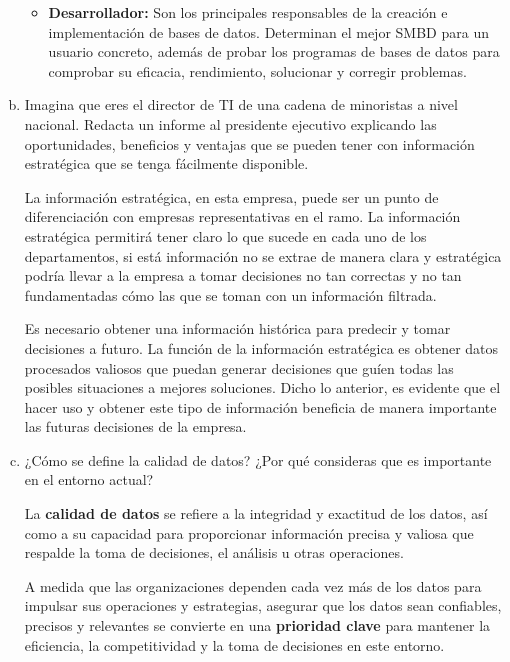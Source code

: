 \documentclass[12pt]{article}
\begin{document}
\begin{enumerate}[a.]
\begin{itemize}
    \item \textbf{Desarrollador: } Son los principales responsables de la creación e implementación de bases de datos. Determinan el mejor SMBD para un usuario concreto, además de probar los programas de bases de datos para comprobar su eficacia, rendimiento, solucionar y corregir problemas.


\end{itemize}

\item Imagina que eres el director de TI de una cadena de minoristas a nivel nacional. Redacta un informe al presidente ejecutivo explicando las oportunidades, beneficios y ventajas que se pueden tener con información estratégica que se tenga fácilmente disponible.\newline

La información estratégica, en esta empresa, puede ser un punto de diferenciación con empresas representativas en el ramo. La información estratégica permitirá tener claro lo que sucede en cada uno de los departamentos, si está información no se extrae de manera clara y estratégica podría llevar a la empresa a tomar decisiones no tan correctas y no tan fundamentadas cómo las que se toman con un información filtrada.\newline

Es necesario obtener una información histórica para predecir y tomar decisiones a futuro. La función de la información estratégica es obtener datos procesados valiosos que puedan generar decisiones que guíen todas las posibles situaciones a mejores soluciones. Dicho lo anterior, es evidente que el hacer uso y obtener este tipo de información beneficia de manera importante las futuras decisiones de la empresa.

\item ¿Cómo se define la calidad de datos? ¿Por qué consideras que es importante en el entorno actual?

La \textbf{calidad de datos} se refiere a la integridad y exactitud de los datos, así como a su capacidad para proporcionar información precisa y valiosa que respalde la toma de decisiones, el análisis u otras operaciones. 

A medida que las organizaciones dependen cada vez más de los datos para impulsar sus operaciones y estrategias, asegurar que los datos sean confiables, precisos y relevantes se convierte en una \textbf{prioridad clave} para mantener la eficiencia, la competitividad y la toma de decisiones en este entorno.



\end{enumerate}
\end{document}
